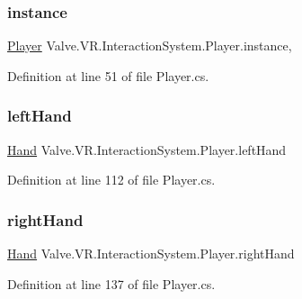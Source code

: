 \subsubsection{\texorpdfstring{instance}{instance}}
{\footnotesize\ttfamily \mbox{\hyperlink{class_valve_1_1_v_r_1_1_interaction_system_1_1_player}{Player}} Valve.\+V\+R.\+Interaction\+System.\+Player.\+instance\hspace{0.3cm}{\ttfamily [static]}, {\ttfamily [get]}}



Definition at line 51 of file Player.\+cs.

\mbox{\label{class_valve_1_1_v_r_1_1_interaction_system_1_1_player_a04948911127247b87dc2256099f1b33a}} 
\subsubsection{\texorpdfstring{leftHand}{leftHand}}
{\footnotesize\ttfamily \mbox{\hyperlink{class_valve_1_1_v_r_1_1_interaction_system_1_1_hand}{Hand}} Valve.\+V\+R.\+Interaction\+System.\+Player.\+left\+Hand\hspace{0.3cm}{\ttfamily [get]}}



Definition at line 112 of file Player.\+cs.

\mbox{\label{class_valve_1_1_v_r_1_1_interaction_system_1_1_player_ad71b2ca999605bd6a1a9b1e8bc797bbb}} 
\subsubsection{\texorpdfstring{rightHand}{rightHand}}
{\footnotesize\ttfamily \mbox{\hyperlink{class_valve_1_1_v_r_1_1_interaction_system_1_1_hand}{Hand}} Valve.\+V\+R.\+Interaction\+System.\+Player.\+right\+Hand\hspace{0.3cm}{\ttfamily [get]}}



Definition at line 137 of file Player.\+cs.

